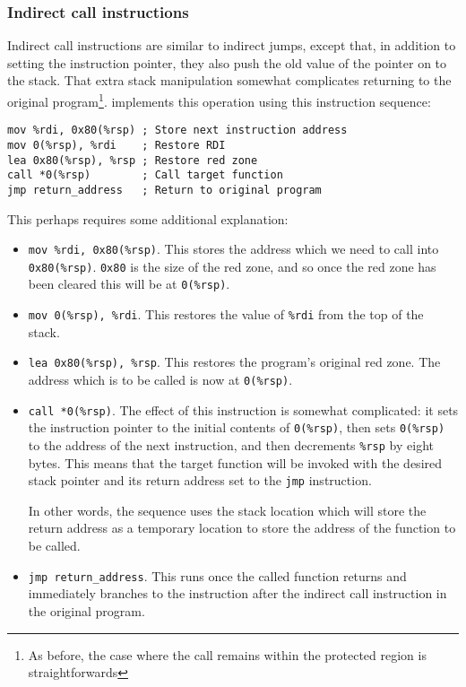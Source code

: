 \subsubsection{Indirect call instructions}

Indirect call instructions are similar to indirect jumps, except that,
in addition to setting the instruction pointer, they also push the old
value of the pointer on to the stack.  That extra stack manipulation
somewhat complicates returning to the original program\footnote{As
  before, the case where the call remains within the protected region
  is straightforwards}.  {\Implementation} implements this operation
using this instruction sequence:

\begin{verbatim}
mov %rdi, 0x80(%rsp) ; Store next instruction address
mov 0(%rsp), %rdi    ; Restore RDI
lea 0x80(%rsp), %rsp ; Restore red zone
call *0(%rsp)        ; Call target function
jmp return_address   ; Return to original program
\end{verbatim}

This perhaps requires some additional explanation:

\begin{itemize}
\item \texttt{mov \%rdi, 0x80(\%rsp)}.  This stores the address which
  we need to call into \texttt{0x80(\%rsp)}.  \texttt{0x80} is the
  size of the red zone, and so once the red zone has been cleared this
  will be at \texttt{0(\%rsp)}.
\item \texttt{mov 0(\%rsp), \%rdi}.  This restores the value of
  \texttt{\%rdi} from the top of the stack.
\item \texttt{lea 0x80(\%rsp), \%rsp}.  This restores the program's
  original red zone.  The address which is to be called is now at
  \texttt{0(\%rsp)}.
\item \texttt{call *0(\%rsp)}.  The effect of this instruction is
  somewhat complicated: it sets the instruction pointer to the initial
  contents of \texttt{0(\%rsp)}, then sets \texttt{0(\%rsp)} to the address
  of the next instruction, and then decrements \texttt{\%rsp} by eight
  bytes.  This means that the target function will be invoked with the
  desired stack pointer and its return address set to the \texttt{jmp}
  instruction.

  In other words, the sequence uses the stack location which will
  store the return address as a temporary location to store the
  address of the function to be called.
\item \texttt{jmp return\_address}.  This runs once the called
  function returns and immediately branches to the instruction after
  the indirect call instruction in the original program.
\end{itemize}

